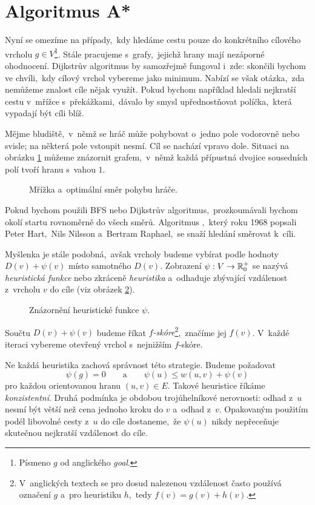 \section{Algoritmus A*}\label{sec:astar}

Nyní se omezíme na případy,~kdy hledáme cestu pouze do konkrétního cílového vrcholu $g\in V$\footnote{Písmeno $g$ od anglického \emph{goal}.}. Stále pracujeme s~grafy,~jejichž hrany mají nezáporné ohodnocení. Dijkstrův algoritmus by samozřejmě fungoval i~zde: skončili bychom ve chvíli,~kdy cílový vrchol vybereme jako minimum. Nabízí se však otázka,~zda nemůžeme znalost cíle nějak využít. Pokud bychom například hledali nejkratší cestu v~mřížce s~překážkami,~dávalo by smysl upřednostňovat políčka,~která vypadají být cíli blíž.

Mějme bludiště,~v~němž se hráč může pohybovat o~jedno pole vodorovně nebo svisle; na některá pole vstoupit nesmí. Cíl se nachází vpravo dole. Situaci na obrázku \ref{fig:mrizka} můžeme znázornit grafem,~v~němž každá přípustná dvojice sousedních polí tvoří hranu s~vahou $1$.
\begin{figure}[ht]
    \centering
    
    \caption{Mřížka a~optimální směr pohybu hráče.}
    \label{fig:mrizka}
\end{figure}
Pokud bychom použili BFS nebo Dijkstrův algoritmus,~prozkoumávali bychom okolí startu rovnoměrně do všech směrů. Algoritmus \Astar,~který roku 1968 popsali Peter Hart,~Nils Nilsson a~Bertram Raphael,~se snaží hledání směrovat k~cíli.

Myšlenka je stále podobná,~avšak vrcholy budeme vybírat podle hodnoty $D(v)+\psi(v)$ místo samotného $D(v)$. Zobrazení $\psi:V \rightarrow \mathbb{R}_0^{+}$ se nazývá \emph{heuristická funkce} nebo zkráceně \emph{heuristika} a~odhaduje zbývající vzdálenost z~vrcholu $v$ do cíle (viz obrázek \ref{fig:astar_heuristika}).
\begin{figure}[ht]
    \centering
    
    \caption{Znázornění heuristické funkce $\psi$.}
    \label{fig:astar_heuristika}
\end{figure}
Součtu $D(v)+\psi(v)$ budeme říkat \emph{$f$-skóre}\footnote{V~anglických textech se pro dosud nalezenou vzdálenost často používá označení $g$ a~pro heuristiku $h$,~tedy $f(v)=g(v)+h(v)$.},~značíme jej $f(v)$. V~každé iteraci vybereme otevřený vrchol s~nejnižším $f$-skóre.

Ne každá heuristika zachová správnost této strategie. Budeme požadovat
\[\psi(g)=0\qquad\text{a}\qquad
\psi(u)\leqslant w(u,v)+\psi(v)\]
pro každou orientovanou hranu $(u,v)\in E$. Takové heuristice říkáme \emph{konzistentní}. Druhá podmínka je obdobou trojúhelníkové nerovnosti: odhad z~$u$ nesmí být větší než cena jednoho kroku do $v$ a~odhad z~$v$. Opakovaným použitím podél libovolné cesty z~$u$ do cíle dostaneme,~že $\psi(u)$ nikdy nepřeceňuje skutečnou nejkratší vzdálenost do cíle.

